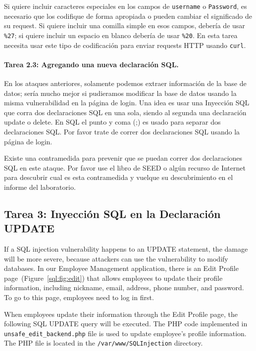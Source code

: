 Si quiere incluir caracteres especiales en los campos de \texttt{username} o \texttt{Password}, es necesario que los codifique de forma apropiada o pueden cambiar el significado de su request. Si quiere incluir una comilla simple en esos campos, debería de usar \texttt{\%27}; si quiere incluir un espacio en blanco debería de usar \texttt{\%20}. En esta tarea necesita usar este tipo de codificación para enviar requests HTTP usando \texttt{curl}.


\paragraph{Tarea 2.3: Agregando una nueva declaración SQL.} 
En los ataques anteriores, solamente podemos extraer información de la base de datos; sería mucho mejor si pudieramos modificar la base de datos usando la misma vulnerabilidad en la página de login. Una idea es usar una Inyección SQL que corra dos declaraciones SQL en una sola, siendo al segunda una declaración update o delete. En SQL el punto y coma (;) es usado para separar dos declaraciones SQL. Por favor trate de correr dos declaraciones SQL usando la página de login.

Existe una contramedida para prevenir que se puedan correr dos declaraciones SQL en este ataque. Por favor use el libro de SEED o algún recurso de Internet para descubrir cual es esta contramedida y vuelque su descubrimiento en el informe del laboratorio.


\subsection{Tarea 3: Inyección SQL en la Declaración UPDATE} 

If a SQL injection vulnerability happens to an UPDATE statement, the damage will be more
severe, because attackers can use the vulnerability to modify databases. 
In our Employee Management application, there is an Edit Profile page~(Figure~\ref{sql:fig:edit}) 
that allows employees to
update their profile information, including nickname, email, address, phone number, and
password. To go to this page, employees need to log in first. 


When employees update their information through the Edit Profile page, the
following SQL UPDATE query will be executed. The PHP code implemented in
{\tt unsafe\_edit\_backend.php} file is used to update employee's profile
information. The PHP file is located in the {\tt /var/www/SQLInjection}
directory.


